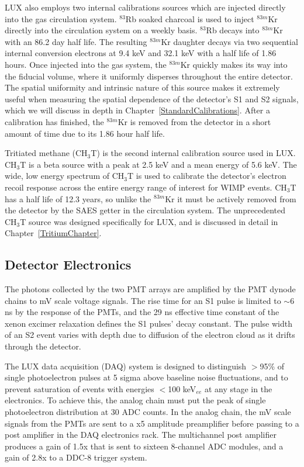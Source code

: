 LUX also employs two internal calibrations sources which are injected directly into the gas circulation system.   $^{83}$Rb soaked charcoal is used to inject $^{83m}$Kr directly into the circulation system on a weekly basis.  $^{83}$Rb decays into $^{83m}$Kr with an 86.2 day half life.   The resulting $^{83m}$Kr daughter decays via two sequential internal conversion electrons at 9.4 keV and 32.1 keV with a half life of 1.86 hours.  Once injected into the gas system, the $^{83m}$Kr quickly makes its way into the fiducial volume, where it uniformly disperses throughout the entire detector.  The spatial uniformity and intrinsic nature of this source makes it extremely useful when measuring the spatial dependence of the detector's S1 and S2 signals, which we will discuss in depth in Chapter~\ref{StandardCalibrations}.  After a calibration has finished, the $^{83m}$Kr is removed from the detector in a short amount of time due to its 1.86 hour half life.  

Tritiated methane (CH$_3$T) is the second internal calibration source used in LUX.  CH$_3$T is a beta source with a peak at 2.5 keV and a mean energy of 5.6 keV.  The wide, low energy spectrum of CH$_3$T is used to calibrate the detector's electron recoil response across the entire energy range of interest for WIMP events.  CH$_3$T has a half life of 12.3 years, so unlike the  $^{83m}$Kr it must be actively removed from the detector by the SAES getter in the circulation system.  The unprecedented CH$_3$T source was designed specifically for LUX, and is discussed in detail in Chapter~\ref{TritiumChapter}.


\subsection{Detector Electronics}

The photons collected by the two PMT arrays are amplified by the PMT dynode chains to mV scale voltage signals.  The rise time for an S1 pulse is limited to $\sim$6 ns by the response of the PMTs, and the 29 ns effective time constant of the xenon excimer relaxation defines the S1 pulses' decay constant.  The pulse width of an S2 event varies with depth due to diffusion of the electron cloud as it drifts through the detector. 

The LUX data acquisition (DAQ) system  is designed to distinguish $>$95\% of single photoelectron pulses at 5 sigma above baseline noise fluctuations, and to prevent saturation of events with energies $<$100 keV$_{ee}$ at any stage in the electronics.  To achieve this, the analog chain must put the peak of single photoelectron distribution at 30 ADC counts.  In the analog chain, the mV scale signals from the PMTs are sent to a x5 amplitude preamplifier before passing to a post amplifier in the DAQ electronics rack. The multichannel post amplifier produces a gain of 1.5x that is sent to sixteen 8-channel ADC modules, and a gain of 2.8x to a DDC-8 trigger system.


